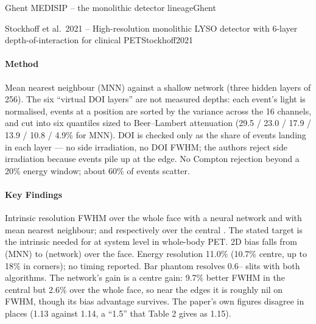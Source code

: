 \begin{programnote}{Ghent MEDISIP -- the monolithic detector lineage}{Ghent}
\begin{papernote}{Stockhoff et al.\ 2021 -- High-resolution monolithic LYSO detector with 6-layer depth-of-interaction for clinical PET}{Stockhoff2021}
\paragraph{Method}
Mean nearest neighbour (MNN) against a shallow network (three hidden layers of
256). The six ``virtual DOI layers'' are not measured depths: each event's
light is normalised, events at a position are sorted by the variance across
the 16 channels, and cut into six quantiles sized to Beer--Lambert
attenuation (29.5 / 23.0 / 17.9 / 13.9 / 10.8 / 4.9\% for MNN). DOI is
checked only as the share of events landing in each layer --- no side
irradiation, no DOI FWHM; the authors reject side irradiation because events
pile up at the edge. No Compton rejection beyond a 20\% energy window; about
60\% of events scatter.

\paragraph{Key Findings}
Intrinsic resolution  FWHM over the whole face with a neural
network and  with mean nearest neighbour;  and 
respectively over the central . The stated target is
the  intrinsic needed for  at system level in whole-body PET.
2D bias falls from  (MNN) to  (network) over the face.
Energy resolution 11.0\% (10.7\% centre, up to 18\% in corners); no timing
reported. Bar phantom resolves 0.6-- slits with both algorithms.
The network's gain is a centre gain: 9.7\% better FWHM in the central
 but 2.6\% over the whole face, so near the edges
it is roughly nil on FWHM, though its bias advantage survives. The paper's
own figures disagree in places (1.13 against 1.14, a ``1.5'' that Table 2 gives
as 1.15).


\end{papernote}
\end{programnote}
